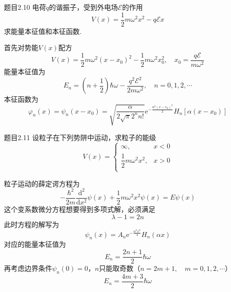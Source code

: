 \begin{question}{题目2.10}
    电荷$q$的谐振子，受到外电场$\mathcal{E}$的作用
    $$
        V(x)=\frac{1}{2}m\omega^2x^2-q\mathcal{E}x
    $$
    求能量本征值和本征函数.
\end{question}
\begin{solution}
    首先对势能$V(x)$配方
    $$
        V(x)=\frac{1}{2}m\omega^2(x-x_0)^2-\frac{1}{2}m\omega^2x_0^2,
        \quad
        x_0=\frac{q\mathcal{E}}{m\omega^2}
    $$
    能量本征值为
    $$
        E_n = \left(n+\frac{1}{2}\right)\hbar\omega-\frac{q^2\mathcal{E}^2}{2m\omega^2}, \quad n = 0, 1, 2, \cdots
    $$
    本征函数为
    $$
        \varphi_n(x)
        = \psi_n(x-x_0)
        = \sqrt{\frac{\alpha}{2\sqrt{\pi}2^nn!}}\mathrm{e}^{-\frac{\alpha^2(x-x_0)^2}{2}}H_n[\alpha(x-x_0)]
    $$
\end{solution}



\begin{question}{题目2.11}
    设粒子在下列势阱中运动，求粒子的能级
    $$
        V(x)=\begin{cases}
            \infty,                   & x<0 \\
            \dfrac{1}{2}m\omega^2x^2, & x>0 \\
        \end{cases}
    $$
\end{question}
\begin{solution}
    粒子运动的薛定谔方程为
    $$
        -\frac{\hbar^2}{2m}\frac{\mathrm{d}^2}{\mathrm{d}x^2}\psi(x) + \frac{1}{2}m\omega^2x^2\psi(x) = E\psi(x)
    $$
    这个变系数微分方程想要得到多项式解，必须满足
    $$
        \lambda-1=2n
    $$
    此时方程的解写为
    $$
        \psi_n(x)=A_n\mathrm{e}^{-\frac{\alpha^2x^2}{4}}H_n(\alpha x)
    $$
    对应的能量本征值为
    $$
        E_n = \frac{2n+1}{2}\hbar\omega
    $$
    再考虑边界条件$\psi_n(0)=0$，$n$只能取奇数（$n=2m+1, \quad m=0, 1, 2, \cdots$）
    $$
        E_n=\frac{4m+3}{2}\hbar\omega
    $$
\end{solution}
